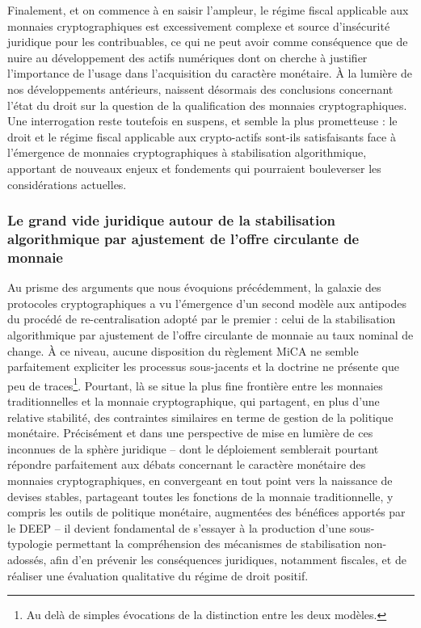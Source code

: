 {Finalement, et on commence à en saisir l'ampleur, le régime fiscal applicable aux monnaies cryptographiques est excessivement complexe et source d'insécurité juridique pour les contribuables, ce qui ne peut avoir comme conséquence que de nuire au développement des actifs numériques dont on cherche à justifier l'importance de l'usage dans l'acquisition du caractère monétaire. À la lumière de nos développements antérieurs, naissent désormais des conclusions concernant l'état du droit sur la question de la qualification des monnaies cryptographiques. Une interrogation reste toutefois en suspens, et semble la plus prometteuse : le droit et le régime fiscal applicable aux crypto-actifs sont-ils satisfaisants face à l'émergence de monnaies cryptographiques à stabilisation algorithmique, apportant de nouveaux enjeux et fondements qui pourraient bouleverser les considérations actuelles.\par

\subsubsection{Le grand vide juridique autour de la stabilisation algorithmique par ajustement de l'offre circulante de monnaie}

Au prisme des arguments que nous évoquions précédemment, la galaxie des protocoles cryptographiques a vu l'émergence d'un second modèle aux antipodes du procédé de re-centralisation adopté par le premier : celui de la stabilisation algorithmique par ajustement de l'offre circulante de monnaie au taux nominal de change. À ce niveau, aucune disposition du règlement MiCA ne semble parfaitement expliciter les processus sous-jacents et la doctrine ne présente que peu de traces\footnote{Au delà de simples évocations de la distinction entre les deux modèles.}. Pourtant, là se situe la plus fine frontière entre les monnaies traditionnelles et la monnaie cryptographique, qui partagent, en plus d'une relative stabilité, des contraintes similaires en terme de gestion de la politique monétaire. Précisément et dans une perspective de mise en lumière de ces inconnues de la sphère juridique \---{} dont le déploiement semblerait pourtant répondre parfaitement aux débats concernant le caractère monétaire des monnaies cryptographiques, en convergeant en tout point vers la naissance de devises stables, partageant toutes les fonctions de la monnaie traditionnelle, y compris les outils de politique monétaire, augmentées des bénéfices apportés par le DEEP \---{} il devient fondamental de s'essayer à la production d'une sous-typologie permettant la compréhension des mécanismes de stabilisation non-adossés, afin d'en prévenir les conséquences juridiques, notamment fiscales, et de réaliser une évaluation qualitative du régime de droit positif.\par

}
